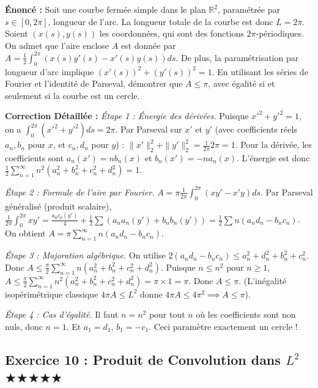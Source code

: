 \documentclass[11pt,a4paper]{article}
\begin{document}
\textbf{Énoncé :} Soit une courbe fermée simple dans le plan $\mathbb{R}^2$, paramétrée par $s \in [0, 2\pi]$, longueur de l'arc. La longueur totale de la courbe est donc $L = 2\pi$. Soient $(x(s), y(s))$ les coordonnées, qui sont des fonctions $2\pi$-périodiques.
On admet que l'aire enclose $A$ est donnée par $A = \frac{1}{2} \int_0^{2\pi} (x(s)y'(s) - x'(s)y(s)) ds$.
De plus, la paramétrisation par longueur d'arc implique $(x'(s))^2 + (y'(s))^2 = 1$.
En utilisant les séries de Fourier et l'identité de Parseval, démontrer que $A \le \pi$, avec égalité si et seulement si la courbe est un cercle.

\textbf{Correction Détaillée :}
\textit{Étape 1 : Énergie des dérivées.}
Puisque $x'^2 + y'^2 = 1$, on a $\int_0^{2\pi} (x'^2 + y'^2) ds = 2\pi$.
Par Parseval sur $x'$ et $y'$ (avec coefficients réels $a_n, b_n$ pour $x$, et $c_n, d_n$ pour $y$) :
$\|x'\|_2^2 + \|y'\|_2^2 = \frac{1}{2\pi} 2\pi = 1$.
Pour la dérivée, les coefficients sont $a_n(x') = n b_n(x)$ et $b_n(x') = -n a_n(x)$.
L'énergie est donc $\frac{1}{2} \sum_{n=1}^\infty n^2 (a_n^2 + b_n^2 + c_n^2 + d_n^2) = 1$.

\textit{Étape 2 : Formule de l'aire par Fourier.}
$A = \pi \frac{1}{2\pi} \int_0^{2\pi} (x y' - x' y) ds$. Par Parseval généralisé (produit scalaire),
$\frac{1}{2\pi} \int_0^{2\pi} x y' = \frac{a_0 c_0(y')}{4} + \frac{1}{2} \sum (a_n a_n(y') + b_n b_n(y')) = \frac{1}{2} \sum n (a_n d_n - b_n c_n)$.
On obtient $A = \pi \sum_{n=1}^\infty n (a_n d_n - b_n c_n)$.

\textit{Étape 3 : Majoration algébrique.}
On utilise $2(a_n d_n - b_n c_n) \le a_n^2 + d_n^2 + b_n^2 + c_n^2$.
Donc $A \le \frac{\pi}{2} \sum_{n=1}^\infty n (a_n^2 + b_n^2 + c_n^2 + d_n^2)$.
Puisque $n \le n^2$ pour $n \ge 1$,
$A \le \frac{\pi}{2} \sum_{n=1}^\infty n^2 (a_n^2 + b_n^2 + c_n^2 + d_n^2) = \pi \times 1 = \pi$.
Donc $A \le \pi$. (L'inégalité isopérimétrique classique $4\pi A \le L^2$ donne $4\pi A \le 4\pi^2 \implies A \le \pi$).

\textit{Étape 4 : Cas d'égalité.}
Il faut $n = n^2$ pour tout $n$ où les coefficients sont non nuls, donc $n=1$.
Et $a_1 = d_1$, $b_1 = -c_1$.
Ceci paramètre exactement un cercle !

\vspace{1cm}
\subsection*{Exercice 10 : Produit de Convolution dans $L^2$ $\bigstar\bigstar\bigstar\bigstar\bigstar$}
\end{document}
